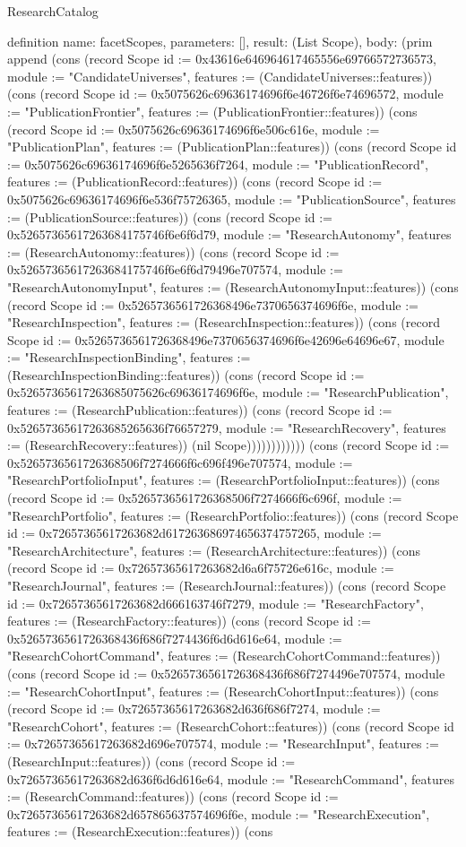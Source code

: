 \begin{lexlean}{ResearchCatalog}
\begin{semanticmodule}
definition{
  name: facetScopes,
  parameters: [],
  result: (List Scope),
  body: (prim append (cons (record Scope {id := 0x43616e646964617465556e69766572736573, module := "CandidateUniverses", features := (CandidateUniverses::features)}) (cons (record Scope {id := 0x5075626c69636174696f6e46726f6e74696572, module := "PublicationFrontier", features := (PublicationFrontier::features)}) (cons (record Scope {id := 0x5075626c69636174696f6e506c616e, module := "PublicationPlan", features := (PublicationPlan::features)}) (cons (record Scope {id := 0x5075626c69636174696f6e5265636f7264, module := "PublicationRecord", features := (PublicationRecord::features)}) (cons (record Scope {id := 0x5075626c69636174696f6e536f75726365, module := "PublicationSource", features := (PublicationSource::features)}) (cons (record Scope {id := 0x52657365617263684175746f6e6f6d79, module := "ResearchAutonomy", features := (ResearchAutonomy::features)}) (cons (record Scope {id := 0x52657365617263684175746f6e6f6d79496e707574, module := "ResearchAutonomyInput", features := (ResearchAutonomyInput::features)}) (cons (record Scope {id := 0x5265736561726368496e7370656374696f6e, module := "ResearchInspection", features := (ResearchInspection::features)}) (cons (record Scope {id := 0x5265736561726368496e7370656374696f6e42696e64696e67, module := "ResearchInspectionBinding", features := (ResearchInspectionBinding::features)}) (cons (record Scope {id := 0x52657365617263685075626c69636174696f6e, module := "ResearchPublication", features := (ResearchPublication::features)}) (cons (record Scope {id := 0x52657365617263685265636f76657279, module := "ResearchRecovery", features := (ResearchRecovery::features)}) (nil Scope)))))))))))) (cons (record Scope {id := 0x5265736561726368506f7274666f6c696f496e707574, module := "ResearchPortfolioInput", features := (ResearchPortfolioInput::features)}) (cons (record Scope {id := 0x5265736561726368506f7274666f6c696f, module := "ResearchPortfolio", features := (ResearchPortfolio::features)}) (cons (record Scope {id := 0x72657365617263682d617263686974656374757265, module := "ResearchArchitecture", features := (ResearchArchitecture::features)}) (cons (record Scope {id := 0x72657365617263682d6a6f75726e616c, module := "ResearchJournal", features := (ResearchJournal::features)}) (cons (record Scope {id := 0x72657365617263682d666163746f7279, module := "ResearchFactory", features := (ResearchFactory::features)}) (cons (record Scope {id := 0x5265736561726368436f686f7274436f6d6d616e64, module := "ResearchCohortCommand", features := (ResearchCohortCommand::features)}) (cons (record Scope {id := 0x5265736561726368436f686f7274496e707574, module := "ResearchCohortInput", features := (ResearchCohortInput::features)}) (cons (record Scope {id := 0x72657365617263682d636f686f7274, module := "ResearchCohort", features := (ResearchCohort::features)}) (cons (record Scope {id := 0x72657365617263682d696e707574, module := "ResearchInput", features := (ResearchInput::features)}) (cons (record Scope {id := 0x72657365617263682d636f6d6d616e64, module := "ResearchCommand", features := (ResearchCommand::features)}) (cons (record Scope {id := 0x72657365617263682d657865637574696f6e, module := "ResearchExecution", features := (ResearchExecution::features)}) (cons }
\end{semanticmodule}
\end{lexlean}
